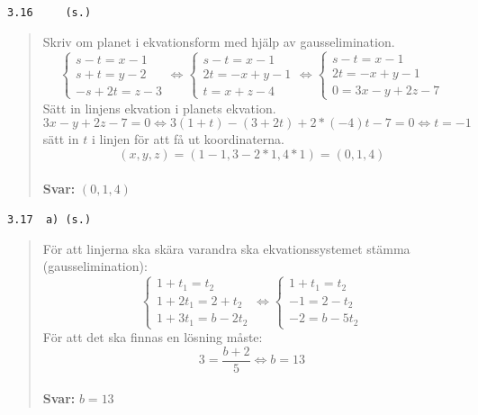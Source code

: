 \documentclass[a4paper]{article}
\newcommand{\tskcol}[1]{\textcolor{tskcol}{#1}}
\begin{document}
\texttt{\tskcol{3.16~~~~ (s.)}}
\begin{quotation}
	\noindent
	Skriv om planet i ekvationsform med hjälp av gausselimination.
	\[\begin{cases}
	s-t=x-1 \\
	s+t=y-2 \\
	-s+2t=z-3
	\end{cases} \Leftrightarrow
	\begin{cases}
	s-t=x-1 \\
	2t=-x+y-1 \\
	t=x+z-4
	\end{cases} \Leftrightarrow
	\begin{cases}
	s-t=x-1 \\
	2t=-x+y-1 \\
	0=3x-y+2z-7
	\end{cases}\]
	Sätt in linjens ekvation i planets ekvation.
	\[3x-y+2z-7=0 \Leftrightarrow
	3(1+t)-(3+2t)+2*(-4)t-7=0 \Leftrightarrow
	t=-1\]
	sätt in $t$ i linjen för att få ut koordinaterna.
	\[(x,y,z)=(1-1,3-2*1,4*1)=(0,1,4)\]
	\\
	\textbf{Svar:} $(0,1,4)$
\end{quotation}

\texttt{\tskcol{3.17~~a) (s.)}}
\begin{quotation}
	\noindent
	För att linjerna ska skära varandra ska ekvationssystemet stämma (gausselimination):
	\[\begin{cases}
	1+t_1=t_2 \\
	1+2t_1=2+t_2 \\
	1+3t_1=b-2t_2
	\end{cases} \Leftrightarrow
	\begin{cases}
	1+t_1=t_2 \\
	-1=2-t_2 \\
	-2=b-5t_2
	\end{cases}\]
	För att det ska finnas en lösning måste:
	\[3=\frac{b+2}{5} \Leftrightarrow
	b=13\]
	\\
	\textbf{Svar:} $b=13$
\end{quotation}
\end{document}
